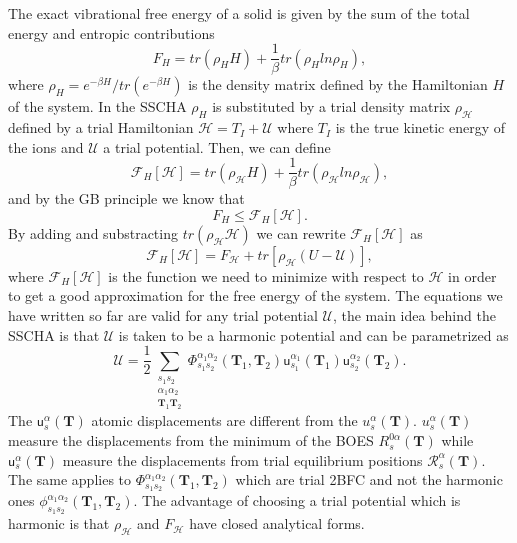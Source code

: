 The exact vibrational free energy of a solid is given by the sum of the total energy and entropic contributions
\begin{equation}
 F_{H}=tr(\rho_{H}H)+\frac{1}{\beta}tr(\rho_{H}ln\rho_{H}),
\end{equation}
where $\rho_{H}=e^{-\beta H}/tr(e^{-\beta H})$ is the density matrix defined by the Hamiltonian $H$ of the system. In the SSCHA $\rho_{H}$ is substituted by a trial density matrix $\rho_{\mathcal{H}}$ defined by a trial 
Hamiltonian $\mathcal{H}=T_{I}+\mathcal{U}$ where $T_{I}$ is the true kinetic energy of the ions and $\mathcal{U}$ a trial potential. Then, we can define
\begin{equation}
 \mathcal{F}_{H}[\mathcal{H}]=tr(\rho_{\mathcal{H}}H)+\frac{1}{\beta}tr(\rho_{\mathcal{H}}ln\rho_{\mathcal{H}}),
\end{equation}
and by the GB principle we know that
\begin{equation}
 F_{H}\le\mathcal{F}_{H}[\mathcal{H}].
\end{equation} 
By adding and substracting $tr(\rho_{\mathcal{H}}\mathcal{H})$ we can rewrite $\mathcal{F}_{H}[\mathcal{H}]$ as
\begin{equation}
 \mathcal{F}_{H}[\mathcal{H}]=F_{\mathcal{H}}+tr[\rho_{\mathcal{H}}(U-\mathcal{U})],
\end{equation}
where $\mathcal{F}_{H}[\mathcal{H}]$ is the function we need to minimize with respect to $\mathcal{H}$ in order to get a good approximation for the free energy of the system. The equations we have written so far are valid 
for any trial potential $\mathcal{U}$, the main idea behind the SSCHA is that $\mathcal{U}$ is taken to be a harmonic potential and can be parametrized as
\begin{equation}
 \mathcal{U}=\frac{1}{2}\sum\limits_{\substack{s_{1}s_{2} \\ \alpha_{1}\alpha_{2} \\ \mathbf{T}_{1}\mathbf{T}_{2}}}\Phi_{s_{1}s_{2}}^{\alpha_{1}\alpha_{2}}(\mathbf{T}_{1},\mathbf{T}_{2})\mathsf{u}_{s_{1}}^{
 \alpha_{1}}(\mathbf{T}_{1})\mathsf{u}_{s_{2}}^{\alpha_{2}}(\mathbf{T}_{2}).
\end{equation}
The $\mathsf{u}_{s}^{\alpha}(\mathbf{T})$ atomic displacements are different from the $u_{s}^{\alpha}(\mathbf{T})$. $u_{s}^{\alpha}(\mathbf{T})$ measure the displacements from the minimum of the BOES $R_{s}^{0\alpha}(\mathbf{T})$
while $\mathsf{u}_{s}^{\alpha}(\mathbf{T})$ measure the displacements from trial equilibrium positions $\mathcal{R}_{s}^{\alpha}(\mathbf{T})$. The same applies to 
$\Phi_{s_{1}s_{2}}^{\alpha_{1}\alpha_{2}}(\mathbf{T}_{1},\mathbf{T}_{2})$ which are trial 2BFC and not the harmonic ones $\phi_{s_{1}s_{2}}^{\alpha_{1}\alpha_{2}}(\mathbf{T}_{1},\mathbf{T}_{2})$. The advantage of choosing a 
trial potential which is harmonic is that $\rho_{\mathcal{H}}$ and $F_{\mathcal{H}}$ have closed analytical forms. \\

